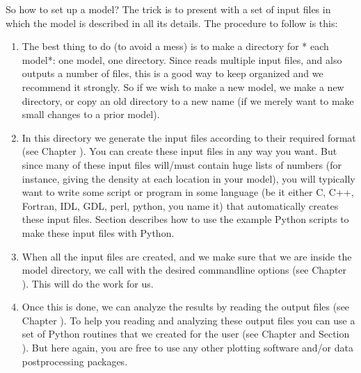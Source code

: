 \documentclass[letterpaper,10pt,english]{sphinxmanual}
\begin{document}
So how to set up a model? The trick is to present  with a set of
input files in which the model is described in all its details. The procedure to
follow is this:
\begin{enumerate}
%
\item {} 
The best thing to do (to avoid a mess) is to make a directory for *
each model*: one model, one directory. Since  reads
multiple input files, and also outputs a number of files, this is a good
way to keep organized and we recommend it strongly.  So if we wish to make
a new model, we make a new directory, or copy an old directory to a new
name (if we merely want to make small changes to a prior model).

\item {} 
In this directory we generate the input files according to their required
format (see Chapter {\hyperref[\detokenize{inputoutputfiles:chap-input-files}]{}}). You can create these input files
in any way you want. But since many of these input files will/must contain
huge lists of numbers (for instance, giving the density at each location in
your model), you will typically want to write some script or program in some
language (be it either C, C++, Fortran, IDL, GDL, perl, python, you name it)
that automatically creates these input files.   Section
{\hyperref[\detokenize{basicstructure:sec-example-models}]{}} describes how to use the example Python scripts to
make these input files with Python.

\item {} 
When all the input files are created, and we make sure that we are inside the
model directory, we call  with the desired command\sphinxhyphen{}line options
(see Chapter {\hyperref[\detokenize{clioptions:chap-command-line-options}]{}}). This will do the work for us.

\item {} 
Once this is done, we can analyze the results by reading the output files
(see Chapter {\hyperref[\detokenize{inputoutputfiles:chap-input-files}]{}}). To help you reading and analyzing
these output files you can use a set of Python routines that we created for
the user (see Chapter {\hyperref[\detokenize{pythontools:chap-python-analysis-tools}]{}} and Section
{\hyperref[\detokenize{installation:sec-install-pythonscripts}]{}}). But here again, you are free to use any
other plotting software and/or data postprocessing packages.

\end{enumerate}
\end{document}
